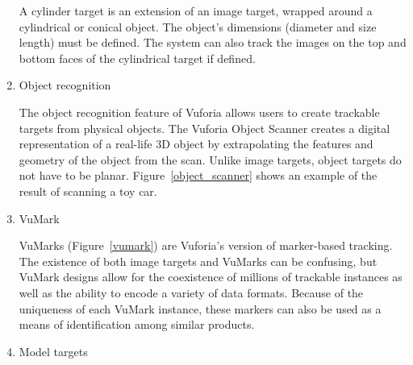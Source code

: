 \begin{enumerate}
A cylinder target is an extension of an image target, wrapped around a cylindrical or conical object. The object's dimensions (diameter and size length) must be defined. The system can also track the images on the top and bottom faces of the cylindrical target if defined.

\item Object recognition

The object recognition feature of Vuforia allows users to create trackable targets from physical objects. The Vuforia Object Scanner creates a digital representation of a real-life 3D object by extrapolating the features and geometry of the object from the scan. Unlike image targets, object targets do not have to be planar. Figure~\ref{object_scanner} shows an example of the result of scanning a toy car. 

\begin{figure}[!ht]
\end{figure}

\item VuMark

\begin{figure}[!ht]
\end{figure}

VuMarks (Figure~\ref{vumark}) are Vuforia's version of marker-based tracking. The existence of both image targets and VuMarks can be confusing, but VuMark designs allow for the coexistence of millions of trackable instances as well as the ability to encode a variety of data formats. Because of the uniqueness of each VuMark instance, these markers can also be used as a means of identification among similar products.

\item Model targets


\end{enumerate}
